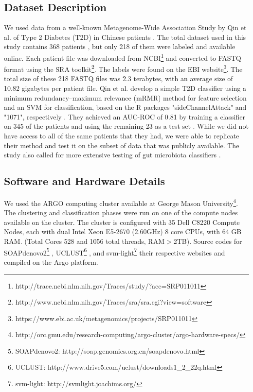 \subsection{Dataset Description}

We used data from a well-known Metagenome-Wide Association Study by Qin et al. of Type 2 Diabetes (T2D) in Chinese patients \cite{qin041012}. The total dataset used in this study contains 368 patients \cite{qin041012}, but only 218 of them were labeled and available online. Each patient file was downloaded from NCBI\footnote{http://trace.ncbi.nlm.nih.gov/Traces/study/?acc=SRP011011}
and converted to FASTQ format using the SRA toolkit\footnote{http://www.ncbi.nlm.nih.gov/Traces/sra/sra.cgi?view=software}.
The labels were found on the EBI website\footnote{https://www.ebi.ac.uk/metagenomics/projects/SRP011011}. The total size of these 218 FASTQ files was 2.3 terabytes, with an average size of 10.82 gigabytes per patient file. Qin et al. develop a simple T2D classifier using a minimum redundancy–maximum relevance (mRMR) method \cite{peng05} for feature selection and an SVM for classification, based on the R packages "sideChannelAttack" and "1071", respectively \cite{qin041012}. They achieved an AUC-ROC of 0.81 by training a classifier on 345 of the patients and using the remaining 23 as a test set \cite{qin041012}. While we did not have access to all of the same patients that they had, we were able to replicate their method and test it on the subset of data that was publicly available. The study also called for more extensive testing of gut microbiota classifiers \cite{qin041012}.

\subsection{Software and Hardware Details}
We used the ARGO computing cluster available at George Mason University\footnote{http://orc.gmu.edu/research-computing/argo-cluster/argo-hardware-specs/}. The clustering and classification phases were run on one of the compute nodes available on the cluster. The cluster is configured with 35 Dell C8220 Compute Nodes, each with dual Intel Xeon E5-2670 (2.60GHz) 8 core CPUs, with 64 GB RAM. (Total Cores 528 and 1056 total threads, RAM$>$2TB). Source codes for 
SOAPdenovo2\footnote{SOAPdenovo2: http://soap.genomics.org.cn/soapdenovo.html} \cite{luo12}, UCLUST\footnote{UCLUST: http://www.drive5.com/uclust/downloads1\_{}2\_{}22q.html}    \cite{Edgar10}, and svm-light\footnote{svm-light: http://svmlight.joachims.org/} \cite{joachims08}
their respective websites and compiled on the Argo platform. 

